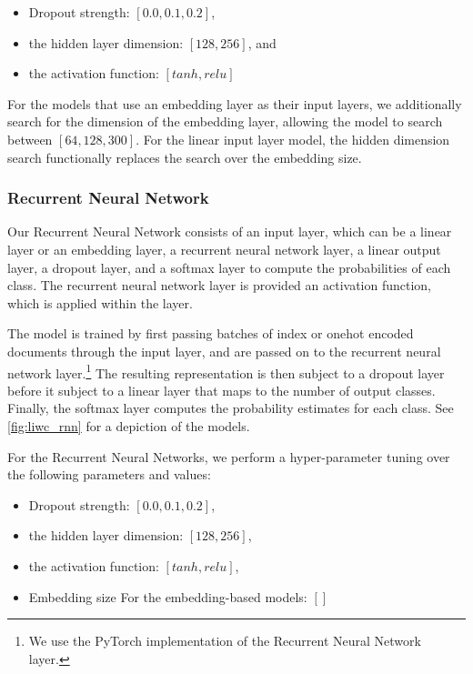 \begin{itemize}
  \item Dropout strength: $[0.0, 0.1, 0.2]$, 
  \item the hidden layer dimension: $[128, 256]$, and
  \item the activation function: $[tanh, relu]$
\end{itemize}

For the models that use an embedding layer as their input layers, we additionally search for the dimension of the embedding layer, allowing the model to search between $[64, 128, 300]$. For the linear input layer model, the hidden dimension search functionally replaces the search over the embedding size.

\subsubsection{Recurrent Neural Network}

Our Recurrent Neural Network consists of an input layer, which can be a linear layer or an embedding layer, a recurrent neural network layer, a linear output layer, a dropout layer, and a softmax layer to compute the probabilities of each class. The recurrent neural network layer is provided an activation function, which is applied within the layer.

The model is trained by first passing batches of index or onehot encoded documents through the input layer, and are passed on to the recurrent neural network layer.\footnote{We use the PyTorch implementation of the Recurrent Neural Network layer.} The resulting representation is then subject to a dropout layer before it subject to a linear layer that maps to the number of output classes. Finally, the softmax layer computes the probability estimates for each class. See \autoref{fig:liwc_rnn} for a depiction of the models.

For the Recurrent Neural Networks, we perform a hyper-parameter tuning over the following parameters and values:

\begin{itemize}
  \item Dropout strength: $[0.0, 0.1, 0.2]$, 
  \item the hidden layer dimension: $[128, 256]$,
  \item the activation function: $[tanh, relu]$,
  \item Embedding size  For the embedding-based models: $[]$
\end{itemize}

